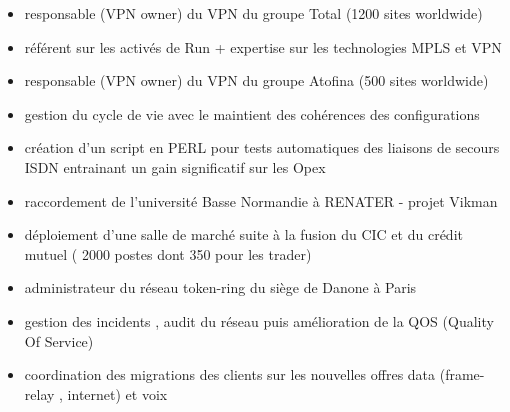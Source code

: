 \documentclass[11pt,a4paper]{moderncv}
\begin{document}
 {}{
\begin{itemize}%
   \item responsable (VPN owner) du VPN du groupe Total (1200 sites worldwide) 
   \item référent sur les activés de Run + expertise sur les technologies MPLS et VPN  \newline 
\end{itemize}}


 {}{
\begin{itemize}%
   \item responsable (VPN owner) du VPN du groupe Atofina (500 sites worldwide) 
   \item gestion du cycle de vie avec le maintient des cohérences des configurations 
   \item création d'un script en PERL pour tests automatiques des liaisons de secours ISDN entrainant un gain significatif sur les Opex  \newline
\end{itemize}}


 {}{ } {}{
\begin{itemize}%
   \item raccordement de l'université Basse Normandie à RENATER - projet Vikman 
   \item déploiement d'une salle de marché suite à la fusion du CIC et du crédit mutuel ( 2000 postes dont 350 pour les trader)  \newline
\end{itemize}}

 {}{
  \begin{itemize}%
   \item administrateur du réseau token-ring du siège de Danone à Paris 
   \item gestion des incidents , audit du réseau puis amélioration de la QOS (Quality Of Service)   \newline
  \end{itemize}}


 {}{
  \begin{itemize}%
   \item coordination des migrations des clients sur les nouvelles offres data (frame-relay , internet) et voix \newline
  \end{itemize}}
\end{document}
